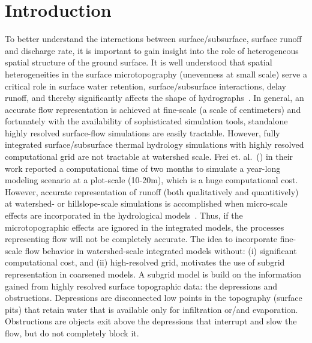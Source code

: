 \documentclass[review,11pt]{elsarticle}
\begin{document}
\linenumbers

\FloatBarrier
\section{Introduction}\label{introduction}
To better understand the interactions between surface/subsurface, surface runoff and discharge rate, it is important to gain insight into the role of
heterogeneous spatial structure of the ground surface.
It is well understood that spatial heterogeneities in the surface microtopography (unevenness at small scale) serve a critical role in surface water retention, surface/subsurface interactions, delay runoff, and thereby significantly affects the shape of hydrographs~\cite{toth1962theory,dunne1991effects,holden2005peatland, kvaerner2008generation, huang2009influences, andresen2015disappearing}. In general, an accurate flow representation is achieved at fine-scale (a scale of centimeters) and fortunately with the availability of sophisticated simulation tools, standalone highly resolved surface-flow simulations are easily tractable. However, fully integrated surface/subsurface thermal hydrology simulations with highly resolved computational grid are not tractable at watershed scale. Frei et. al.~(\citeyear{frei2010effects}) in their work reported a computational time of two months to simulate a year-long modeling scenario at a plot-scale (10-20m), which is a huge computational cost. However, accurate representation of runoff (both qualitatively and quantitively) at watershed- or hillslope-scale simulations is accomplished when micro-scale effects are incorporated in the hydrological models~\cite{bronstert1997modelling,nakayama2006simulation}. Thus, if the microtopographic effects are ignored in the integrated models, the processes representing flow will not be completely accurate. 
The idea to incorporate fine-scale flow behavior in watershed-scale integrated models without: (i) significant computational cost, and (ii) high-resolved grid, motivates the use of subgrid representation in coarsened models. A subgrid model is build on the information gained from highly resolved surface topographic data: the depressions and obstructions. Depressions are disconnected low points in the topography (surface pits) that retain water that is available only for infiltration or/and evaporation. Obstructions are objects exit above the depressions that interrupt and slow the flow, but do not completely block it. 
\end{document}
